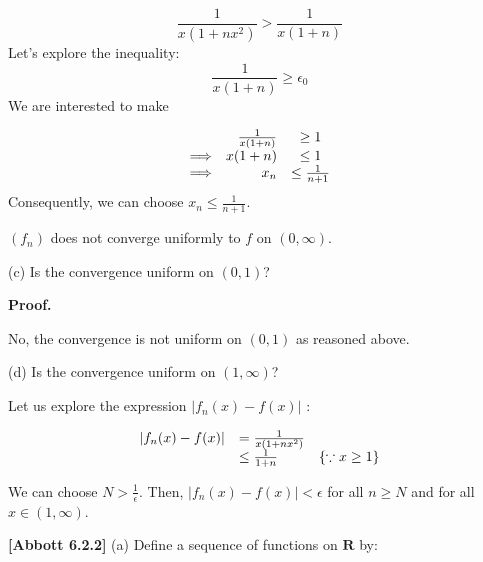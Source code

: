 \documentclass[10pt]{article}
\begin{document}
\begin{equation*}
\frac{1}{x\left( 1+nx^{2}\right)}  >\frac{1}{x( 1+n)}
\end{equation*}
Let's explore the inequality:
\begin{equation*}
\frac{1}{x( 1+n)} \geq \epsilon _{0}
\end{equation*}
We are interested to make


\begin{equation*}
\begin{array}{ r r c }
 & \frac{1}{x( 1+n)} & \geq 1\\
\Longrightarrow  & x( 1+n) & \leq 1\\
\Longrightarrow  & x_{n} & \leq \frac{1}{n+1}
\end{array}
\end{equation*}
Consequently, we can choose $\displaystyle x_{n} \leq \frac{1}{n+1}$. 



$\displaystyle ( f_{n})$ does not converge uniformly to $\displaystyle f$ on $\displaystyle ( 0,\infty )$. 



(c) Is the convergence uniform on $\displaystyle ( 0,1)$?



\textbf{Proof.}



No, the convergence is not uniform on $\displaystyle ( 0,1)$ as reasoned above.



(d) Is the convergence uniform on $\displaystyle ( 1,\infty )$?



Let us explore the expression $\displaystyle |f_{n}( x) -f( x) |$ :


\begin{equation*}
\begin{array}{ c l c }
|f_{n}( x) -f( x) | & =\frac{1}{x\left( 1+nx^{2}\right)} & \\
 & \leq \frac{1}{1+n} & \{\because x\geq 1\}
\end{array}
\end{equation*}


We can choose $\displaystyle N >\frac{1}{\epsilon }$. Then, $\displaystyle |f_{n}( x) -f( x) |< \epsilon $ for all $\displaystyle n\geq N$ and for all $\displaystyle x\in ( 1,\infty )$. 



\textbf{[Abbott 6.2.2]} (a) Define a sequence of functions on $\displaystyle \mathbf{R}$ by:
\end{document}
